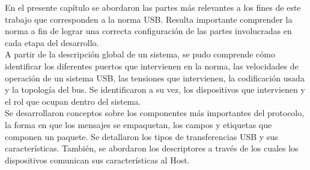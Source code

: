 En el presente capítulo se abordaron las partes más relevantes a los fines de este trabajo que corresponden a la norma USB. Resulta importante comprender la norma a fin de lograr una correcta configuración de las partes involucradas en cada etapa del desarrollo.\\

A partir de la descripción global de un sistema, se pudo comprende cómo identificar los diferentes puertos que intervienen en la norma, las velocidades de operación de un sistema USB, las tensiones que intervienen, la codificación usada y la topología del bus. Se identificaron a su vez, los dispositivos que intervienen y el rol que ocupan dentro del sistema.\\

Se desarrollaron conceptos sobre los componentes más importantes del protocolo, la forma en que los mensajes se empaquetan, los campos y etiquetas que componen un paquete. Se detallaron los tipos de transferencias USB y sus características. También, se abordaron los descriptores a través de los cuales los dispositivos comunican sus características al Host.